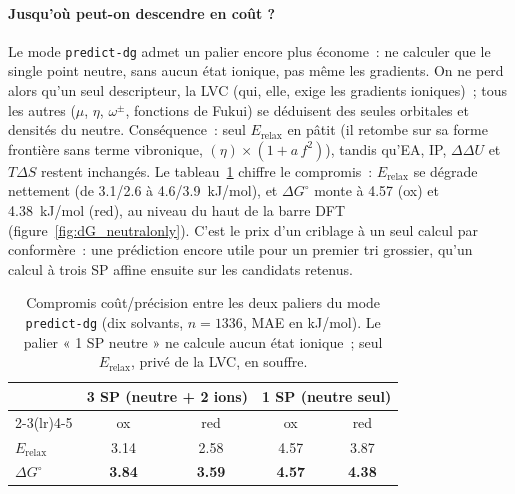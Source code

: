 \paragraph{Jusqu'où peut-on descendre en coût ?}
Le mode \texttt{predict-dg} admet un palier encore plus économe~: ne calculer que le single point neutre, sans aucun état ionique, pas même les gradients. On ne perd alors qu'un seul descripteur, la LVC (qui, elle, exige les gradients ioniques)~; tous les autres ($\mu$, $\eta$, $\omega^\pm$, fonctions de Fukui) se déduisent des seules orbitales et densités du neutre. Conséquence~: seul $E_{\text{relax}}$ en pâtit (il retombe sur sa forme frontière sans terme vibronique, $(\eta)\times(1+a\,f^2)$), tandis qu'EA, IP, $\Delta\Delta U$ et $T\Delta S$ restent inchangés. Le tableau~\ref{tab:tiers} chiffre le compromis~: $E_{\text{relax}}$ se dégrade nettement (de \SI{3.1}{}/\SI{2.6}{} à \SI{4.6}{}/\SI{3.9}{kJ/mol}), et $\Delta G^\circ$ monte à \SI{4.57}{} (ox) et \SI{4.38}{kJ/mol} (red), au niveau du haut de la barre DFT (figure~\ref{fig:dG_neutralonly}). C'est le prix d'un criblage à un seul calcul par conformère~: une prédiction encore utile pour un premier tri grossier, qu'un calcul à trois SP affine ensuite sur les candidats retenus.

\begin{table}[H]
\centering
\caption{Compromis coût/précision entre les deux paliers du mode \texttt{predict-dg} (dix solvants, $n = 1336$, MAE en kJ/mol). Le palier « 1 SP neutre » ne calcule aucun état ionique~; seul $E_{\text{relax}}$, privé de la LVC, en souffre.}
\label{tab:tiers}
\footnotesize
\begin{tabular}{lcccc}
\toprule
 & \multicolumn{2}{c}{\textbf{3 SP} (neutre + 2 ions)} & \multicolumn{2}{c}{\textbf{1 SP} (neutre seul)} \\
\cmidrule(lr){2-3}\cmidrule(lr){4-5}
 & ox & red & ox & red \\
\midrule
$E_{\text{relax}}$ & 3.14 & 2.58 & 4.57 & 3.87 \\
$\Delta G^\circ$   & \textbf{3.84} & \textbf{3.59} & \textbf{4.57} & \textbf{4.38} \\
\bottomrule
\end{tabular}
\end{table}

